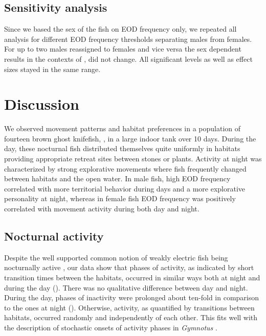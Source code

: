 \subsection{Sensitivity analysis}
Since we based the sex of the fish on EOD frequency only, we repeated all analysis for different EOD frequency thresholds separating males from females. For up to two males reassigned to females and vice versa the sex dependent results in the contexts of ,  did not change. All significant levels as well as effect sizes stayed in the same range.

\section{Discussion}
We observed movement patterns and habitat preferences in a population of fourteen brown ghost knifefish, \lepto{}, in a large indoor tank over 10 days. During the day, these
nocturnal fish distributed themselves quite uniformly in habitats providing appropriate retreat sites between stones or plants. Activity at night was characterized by strong explorative movements where fish frequently changed between habitats and the open water. In male fish, high EOD frequency correlated with more territorial behavior during days and a more explorative personality at night, whereas in female fish EOD frequency was positively correlated with movement activity during both day and night.

\subsection{Nocturnal activity}
Despite the well supported common notion of weakly electric fish being nocturnally active \citep{Lissmann1965, Zupanc2001, Henninger2018}, our data show that phases of activity, as indicated by short transition times between the habitats, occurred in similar ways both at night and during the day (). There was no qualitative difference between day and night. During the day, phases of inactivity were prolonged
about ten-fold in comparison to the ones at night ().
Otherwise, activity, as quantified by transitions between habitats, occurred randomly and independently of each other. This fits well with the description of stochastic onsets of activity phases in \textit{Gymnotus} \citep{Jun2014}.

